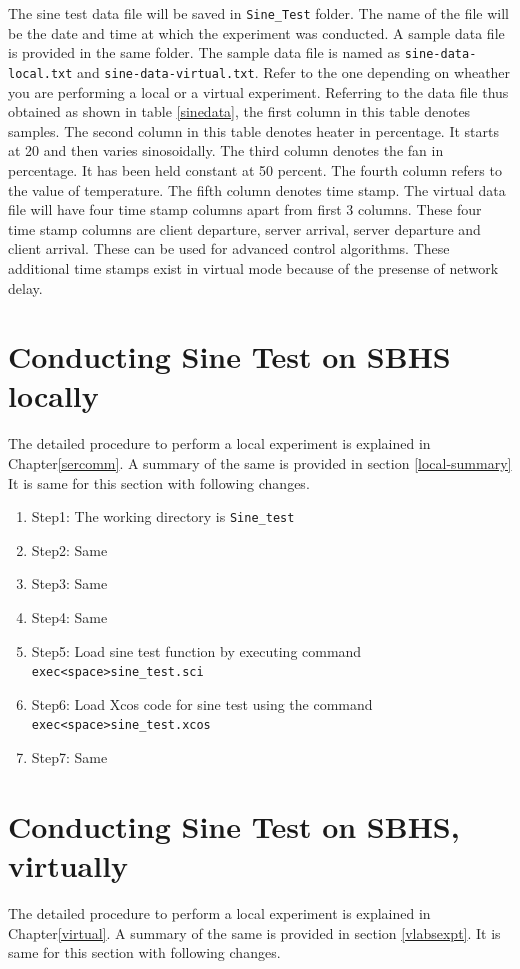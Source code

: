 The sine test data file will be saved in {\tt Sine\_Test} folder. The name of the file will be the date and time at which the experiment was conducted. A sample data file is provided in the same folder. The sample data file is named as {\tt sine-data-local.txt} and {\tt sine-data-virtual.txt}. Refer to the one depending on wheather you are performing a local or a virtual experiment. Referring to the data file thus obtained as shown in table \ref{sinedata}, the first column in this table denotes samples. The second column in this table denotes heater in percentage. It starts at 20 and then varies sinosoidally. The third column denotes the fan in percentage. It has been held constant at 50 percent. The fourth column refers to the value of temperature. The fifth column denotes time stamp. The virtual data file will have four time stamp columns apart from first 3 columns. These four time stamp columns are client departure, server arrival, server departure and client arrival. These can be used for advanced control algorithms. These additional time stamps exist in virtual mode because of the presense of network delay.

\section{Conducting Sine Test on SBHS locally}
The detailed procedure to perform a local experiment is explained in Chapter\ref{sercomm}. A summary of the same is provided in section \ref{local-summary} It is same for this section with following changes.

\begin{enumerate}
\item Step1: The working directory is {\tt  Sine\_test}
\item Step2: Same
\item Step3: Same
\item Step4: Same
\item Step5: Load sine test function by executing command\\ {\tt exec<space>sine\_test.sci}
\item Step6: Load Xcos code for sine test using the command\\ {\tt exec<space>sine\_test.xcos}
\item Step7: Same
\end{enumerate}


\section{Conducting Sine Test on SBHS, virtually}
The detailed procedure to perform a local experiment is explained in Chapter\ref{virtual}. A summary of the same is provided in section \ref{vlabsexpt}. It is same for this section with following changes.

